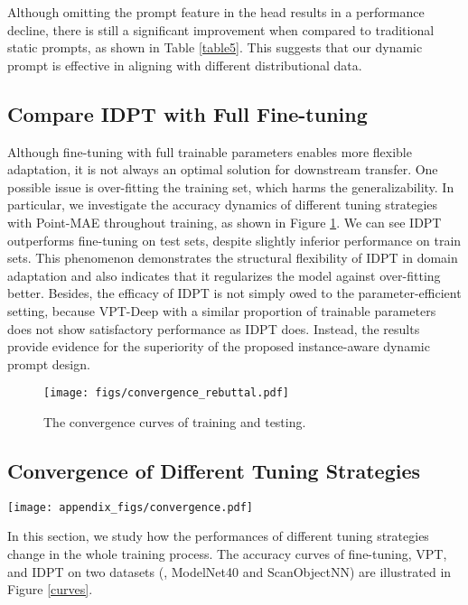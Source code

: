 \documentclass[10pt,twocolumn,letterpaper]{article}
\begin{document}
Although omitting the prompt feature in the head results in a performance decline, there is still a significant improvement when compared to traditional static prompts, as shown in Table \ref{table5}. This suggests that our dynamic prompt is effective in aligning with different distributional data.


\subsection{Compare IDPT with Full Fine-tuning} 
Although fine-tuning with full trainable parameters enables more flexible adaptation, 
it is not always an optimal solution for downstream transfer. 
One possible issue is over-fitting the training set, which harms the generalizability. 
In particular, we investigate the accuracy dynamics of different tuning strategies with Point-MAE throughout training, as shown in Figure \ref{reason}. 
We can see IDPT outperforms fine-tuning on test sets, despite slightly inferior performance on train sets. 
This phenomenon demonstrates the structural flexibility of IDPT in domain adaptation and also indicates that it regularizes the model against over-fitting better. 
Besides, the efficacy of IDPT is not simply owed to the parameter-efficient setting, because VPT-Deep with a similar proportion of trainable parameters does not show satisfactory performance as IDPT does. 
Instead, the results provide evidence for the superiority of the proposed instance-aware dynamic prompt design.

\begin{figure}[h]
\centering
\texttt{[image: figs/convergence\_rebuttal.pdf]} 
\caption{The convergence curves of training and testing.
}
\label{reason}
\end{figure}


\subsection{Convergence of Different Tuning Strategies}

\begin{figure*}[h]
\centering
\texttt{[image: appendix\_figs/convergence.pdf]} 
\caption{The classification accuracy curves of fine-tuning, VPT, and our IDPT strategy on two datasets.}
\label{curves}
\end{figure*}

In this section, we study how the performances of different tuning strategies change in the whole training process. 
The accuracy curves of fine-tuning, VPT, and IDPT on two datasets (\ie, ModelNet40 and ScanObjectNN) are illustrated in Figure \ref{curves}. 
\end{document}
